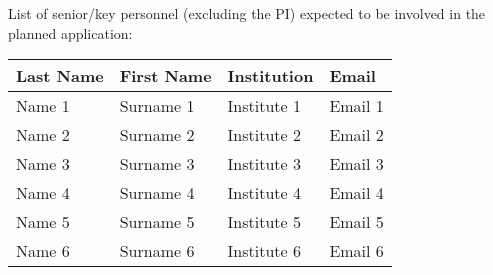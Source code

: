 

\begin{table}[!h]
\centering
\vspace{2\baselineskip}
\end{table}

\noindent List of senior/key personnel (excluding the PI) expected to be involved in the planned application:

\begin{table}[!h]
\centering
\begin{tabular}{|l|l|l|l|}
\hline
{\bf Last Name} & {\bf First Name} & {\bf Institution} & {\bf Email}\\ %
\hline
Name 1 & Surname 1 & Institute 1 & Email 1\\
\hline
Name 2 & Surname 2 & Institute 2 & Email 2\\
\hline
Name 3 & Surname 3 & Institute 3 & Email 3\\
\hline
Name 4 & Surname 4 & Institute 4 & Email 4\\
\hline
Name 5 & Surname 5 & Institute 5 & Email 5\\
\hline
Name 6 & Surname 6 & Institute 6 & Email 6\\
\hline
\end{tabular}
\end{table}

